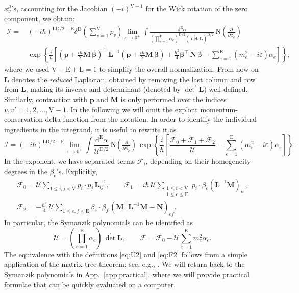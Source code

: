 \documentclass[12pt]{article}
\numberwithin{figure}{section}
\def \be {\begin{equation}}
\def \ee {\end{equation}}
\def \nn {\nonumber}
\def \D {\mathrm{D}}
\def \E {\mathrm{E}}
\def \L {\mathrm{L}}
\def \U {\mathcal{U}}
\def \F {\mathcal{F}}
\def \d {\mathrm{d}}
\def \eps {\varepsilon}
\def \leq {\leqslant}
\def \I {\mathcal{I}}
\def \NN {\mathrm{N}}
\def \VV {\mathrm{V}}
\def \LL {\mathbf{L}}
\begin{document}
$x_v^\mu$'s, accounting for the Jacobian $(-i)^{\mathrm{V}-1}$ for the Wick rotation of the zero component, we obtain:
%
\begin{align}
\I = \,& (-i\hbar)^{\L\D/2-\E} \delta^\D({\textstyle\sum}_{v=1}^{\mathrm{V}} p_v) \lim_{\eps \to 0^+} \int \frac{\d^{\E}\alpha}{(\prod_{e=1}^{\E}\! \alpha_e)^{\D/2}({\det}^\prime \mathbf{L})^{\D/2}}\,\NN(\tfrac{\partial}{\partial \beta_{e}})\,\\
	& \exp \left\{ \frac{i}{\hbar}\left[(\mathbf{p}+ \tfrac{i\hbar}{2}\mathbf{M}\,\bm{\beta} )^\intercal\, \mathbf{L}^{-1} (\mathbf{p}+ \tfrac{i\hbar}{2}\mathbf{M}\,\bm{\beta}) + \tfrac{\hbar^2}{4} \bm{\beta}^\intercal\,\mathbf{N}\,\bm{\beta} - \sum_{e=1}^{\E}  (m_e^2 - i\eps) \alpha_e  \right] \right\} ,\nn
\end{align}
%
where we used $\VV - \E + \L = 1$ to simplify the overall normalization.
From now on $\mathbf{L}$ denotes the \emph{reduced} Laplacian, obtained by removing the last column and row from $\mathbf{L}$, making its inverse and determinant (denoted by ${\det}^\prime \LL$) well-defined. Similarly, contraction with $\mathbf{p}$ and $\mathbf{M}$ is only performed over the indices
$v,v'=1,2,\ldots,\mathrm{V}{-}1$. In the following we will omit the explicit momentum-conservation delta function from the notation.
In order to identify the individual ingredients in the integrand, it is useful to rewrite it as
%
\be
\I = (-i\hbar)^{\L\D/2-\E} \lim_{\eps \to 0^+} \int \frac{\d^{\E}\alpha}{\U^{\D/2}}\, \NN(\tfrac{\partial}{\partial \beta_{e}})\, \exp \left\{ \frac{i}{\hbar} \left[ \frac{\F_0 + \F_1 + \F_2}{\U} - \sum_{e=1}^{\E} (m_e^2 - i\eps) \alpha_e \right] \right\}.
\ee
%
In the exponent, we have separated terms $\F_i$, depending on their homogeneity degrees in the $\beta_e$'s. Explicitly,
%
\begin{gather}\label{eq:F01}
\F_0 = \U\!\! \sum_{1 \leq i, j < \VV} \!\!\! p_i {\cdot} p_j\, \LL^{-1}_{ij},\qquad \F_1 = i\hbar\,\U\!\! \sum_{\substack{1 \leq i < \VV\\ 1\leq e \leq \E}} p_i{\cdot}\beta_e (\mathbf{L}^{-1} \mathbf{M})_{ie},\\
\F_2 = -\tfrac{\hbar^2}{4}\,\U \!\!\sum_{1\leq e, f \leq \E} \!\!\!\beta_e {\cdot} \beta_f\, (\mathbf{M}^\intercal \mathbf{L}^{-1} \mathbf{M} - \mathbf{N})_{ef}.\label{eq:F22}
\end{gather}
%
In particular, the Symanzik polynomials can be identified as
%
\be\label{eq:U1}
\U = ({\textstyle\prod}_{e=1}^{\E} \alpha_e)\, {\det}^\prime \mathbf{L}, \qquad \F = \F_0 - \U \sum_{e=1}^{\E} m_e^2 \alpha_e.
\ee
%
The equivalence with the definitions \eqref{eq:U2} and \eqref{eq:F2} follows from a simple application of the matrix-tree theorem; see, e.g., \cite{AHHM}. We will return back to the Symanzik polynomials in App.~\ref{app:practical}, where we will provide practical formulae that can be quickly evaluated on a computer.
\end{document}
